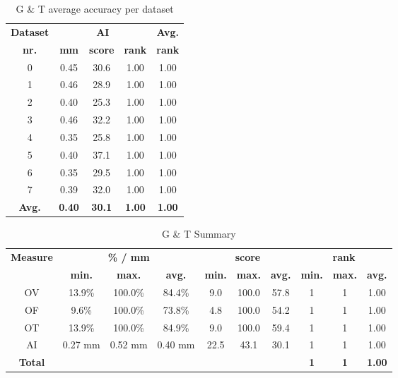 \begin{table*}
\scriptsize
\caption{G \& T average accuracy per dataset}
\centering
\begin{tabular}{|c|ccc|c|}
\hline
\multicolumn{1}{|c|}{\textbf{Dataset}} &\multicolumn{3}{c|}{\textbf{AI}} &\multicolumn{1}{c|}{\textbf{Avg.}} \\
\multicolumn{1}{|c|}{\textbf{nr.}} &\multicolumn{1}{c|}{\textbf{mm}} &\multicolumn{1}{c|}{\textbf{score}} &\multicolumn{1}{c|}{\textbf{rank}} &\multicolumn{1}{c|}{\textbf{rank}}\\
\hline
0&0.45&30.6& 1.00& 1.00\\
1&0.46&28.9& 1.00& 1.00\\
2&0.40&25.3& 1.00& 1.00\\
3&0.46&32.2& 1.00& 1.00\\
4&0.35&25.8& 1.00& 1.00\\
5&0.40&37.1& 1.00& 1.00\\
6&0.35&29.5& 1.00& 1.00\\
7&0.39&32.0& 1.00& 1.00\\
\hline
\textbf{Avg.}&\textbf{0.40}&\textbf{30.1}&\textbf{ 1.00}&\textbf{ 1.00}\\
\hline
\end{tabular}
\vspace{-0.3cm}
\label{tb:tb_4_5}
\normalsize
\end{table*}

\begin{table*}
\scriptsize
\caption{G \& T Summary}
\centering
\begin{tabular}{|c|ccc|ccc|ccc|}
\hline
\multicolumn{1}{|c|}{\textbf{Measure}} &\multicolumn{3}{c|}{\textbf{\% / mm}} &\multicolumn{3}{c|}{\textbf{score}} &\multicolumn{3}{c|}{\textbf{rank}} \\
\multicolumn{1}{|c|}{\textbf{}} &\multicolumn{1}{c|}{\textbf{min.}} &\multicolumn{1}{c|}{\textbf{max.}} &\multicolumn{1}{c|}{\textbf{avg.}} &\multicolumn{1}{c|}{\textbf{min.}} &\multicolumn{1}{c|}{\textbf{max.}} &\multicolumn{1}{c|}{\textbf{avg.}} &\multicolumn{1}{c|}{\textbf{min.}} &\multicolumn{1}{c|}{\textbf{max.}} &\multicolumn{1}{c|}{\textbf{avg.}}\\
\hline
OV&13.9\%&100.0\%&84.4\%& 9.0&100.0&57.8&1&1& 1.00\\
OF& 9.6\%&100.0\%&73.8\%& 4.8&100.0&54.2&1&1& 1.00\\
OT&13.9\%&100.0\%&84.9\%& 9.0&100.0&59.4&1&1& 1.00\\
AI&0.27 mm&0.52 mm&0.40 mm&22.5&43.1&30.1&1&1& 1.00\\
\hline
\textbf{Total}&\textbf{}&\textbf{}&\textbf{}&\textbf{}&\textbf{}&\textbf{}&\textbf{1}&\textbf{1}&\textbf{ 1.00}\\
\hline
\end{tabular}
\vspace{-0.3cm}
\label{tb:tb_4_6}
\normalsize
\end{table*}

